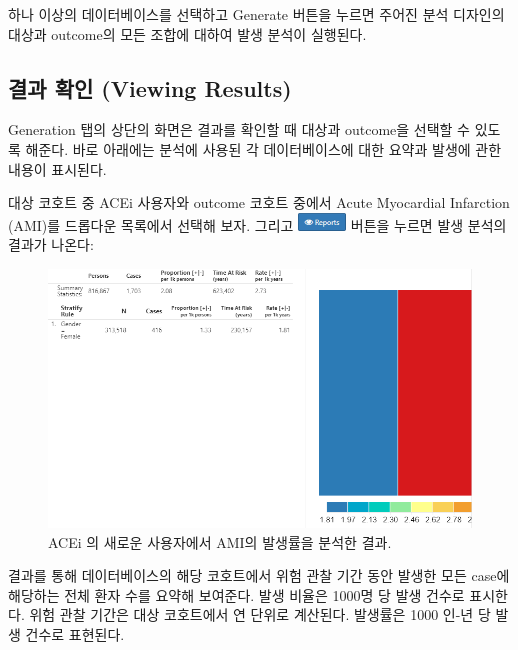 \documentclass[11pt]{book}
\theoremstyle{definition}
\theoremstyle{definition}
\theoremstyle{definition}
\theoremstyle{remark}
\begin{document}
하나 이상의 데이터베이스를 선택하고 Generate 버튼을 누르면 주어진 분석
디자인의 대상과 outcome의 모든 조합에 대하여 발생 분석이 실행된다.

\subsection{결과 확인 (Viewing Results)}\label{--viewing-results-1}

Generation 탭의 상단의 화면은 결과를 확인할 때 대상과 outcome을 선택할
수 있도록 해준다. 바로 아래에는 분석에 사용된 각 데이터베이스에 대한
요약과 발생에 관한 내용이 표시된다.

대상 코호트 중 ACEi 사용자와 outcome 코호트 중에서 Acute Myocardial
Infarction (AMI)를 드롭다운 목록에서 선택해 보자. 그리고
\includegraphics{images/Characterization/atlasIncidenceReportButton.png}
버튼을 누르면 발생 분석의 결과가 나온다:

\begin{figure}

{\centering \includegraphics[width=1\linewidth]{images/Characterization/atlasIncidenceResults} 

}

\caption{ACEi 의 새로운 사용자에서 AMI의 발생률을 분석한 결과.}\label{fig:atlasIncidenceResults}
\end{figure}

결과를 통해 데이터베이스의 해당 코호트에서 위험 관찰 기간 동안 발생한
모든 case에 해당하는 전체 환자 수를 요약해 보여준다. 발생 비율은 1000명
당 발생 건수로 표시한다. 위험 관찰 기간은 대상 코호트에서 연 단위로
계산된다. 발생률은 1000 인-년 당 발생 건수로 표현된다.
\end{document}
